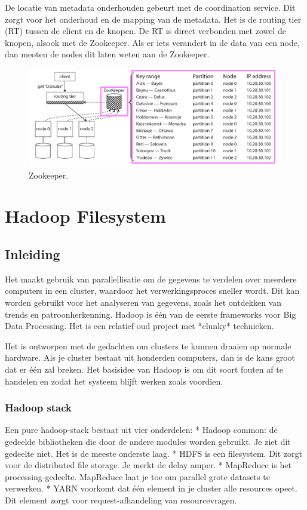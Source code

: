 \documentclass[a4paper,10pt,twoside]{report}
\begin{document}
De locatie van metadata onderhouden gebeurt met de coordination service. Dit zorgt voor het onderhoud en de mapping van de metadata. Het is de routing tier (RT) tussen de client en de knopen. De RT is direct verbonden met zowel de knopen, alsook met de Zookeeper. Als er iets verandert in de data van een node, dan meoten de nodes dit laten weten aan de Zookeeper.

\begin{figure}
	\includegraphics[width=\linewidth]{../images/Screenshot_217.png}
	\caption{Zookeeper.}
\end{figure}

\chapter{Hadoop Filesystem}

\section{Inleiding}

Het maakt gebruik van parallellisatie om de gegevens te verdelen over meerdere computers in een cluster, waardoor het verwerkingsproces sneller wordt. Dit kan worden gebruikt voor het analyseren van gegevens, zoals het ontdekken van trends en patroonherkenning. Hadoop is één van de eerste frameworks voor Big Data Processing. Het is een relatief oud project met *clunky* technieken. 

Het is ontworpen met de gedachten om clusters te kunnen draaien op normale hardware. Als je cluster bestaat uit honderden computers, dan is de kans groot dat er één zal breken. Het basisidee van Hadoop is om dit soort fouten af te handelen en zodat het systeem blijft werken zoals voordien.

\subsection{Hadoop stack}

Een pure hadoop-stack bestaat uit vier onderdelen:
* Hadoop common: de gedeelde bibliotheken die door de andere modules worden gebruikt. Je ziet dit gedeelte niet. Het is de meeste onderste laag.
* HDFS is een filesystem. Dit zorgt voor de distributed file storage. Je merkt de delay amper.
* MapReduce is het processing-gedeelte. MapReduce laat je toe om parallel grote datasets te verwerken.
* YARN voorkomt dat één element in je cluster alle resources opeet. Dit element zorgt voor request-afhandeling van resourcevragen.
\end{document}
